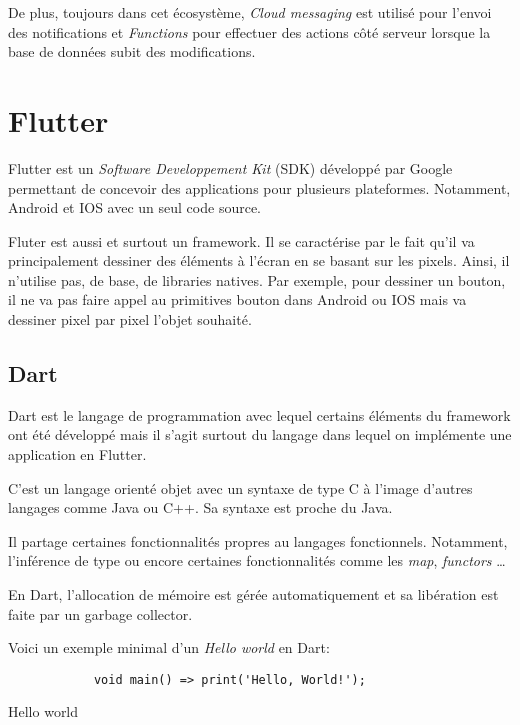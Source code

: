De plus, toujours dans cet écosystème, \textit{Cloud messaging} est utilisé pour l'envoi des notifications et \textit{Functions} pour
effectuer des actions côté serveur lorsque la base de données subit des modifications.

\section{Flutter}
Flutter est un \textit{Software Developpement Kit} (SDK) développé par Google permettant de concevoir
des applications pour plusieurs plateformes. Notamment, Android et IOS avec un seul code source.

Fluter est aussi et surtout un framework. Il se caractérise par le fait qu'il va principalement dessiner des éléments
à l'écran en se basant sur les pixels. Ainsi, il n'utilise pas, de base, de libraries natives. Par exemple, pour dessiner un
bouton, il ne va pas faire appel au primitives bouton dans Android ou IOS mais va dessiner pixel par pixel
l'objet souhaité.

\subsection{Dart}
Dart est le langage de programmation avec lequel certains éléments du framework ont été développé mais il s'agit
surtout du langage dans lequel on implémente une application en Flutter.

C'est un langage orienté objet avec un syntaxe de type C à l'image d'autres langages comme Java ou C++.
Sa syntaxe est proche du Java.

Il partage certaines fonctionnalités propres au langages fonctionnels. Notamment, l'inférence de type ou encore
certaines fonctionnalités comme les \textit{map}, \textit{functors} \dots

En Dart, l'allocation de mémoire est gérée automatiquement et sa libération est faite par un garbage collector.

Voici un exemple minimal d'un \textit{Hello world} en Dart:
\begin{listing}[!h]
    \begin{verbatim}
            void main() => print('Hello, World!');
        \end{verbatim}
    \label{code:helloWorld}
    \caption{Hello world}
\end{listing}
\newpage

